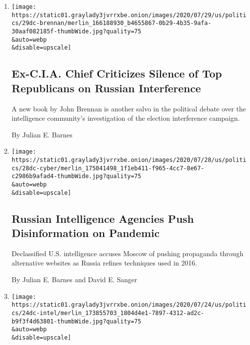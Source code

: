 \begin{enumerate}
\def\labelenumi{\arabic{enumi}.}
\item
  \href{/2020/07/29/us/politics/john-brennan-book.html}{}

  \texttt{[image: https://static01.graylady3jvrrxbe.onion/images/2020/07/29/us/politics/29dc-brennan/merlin\_166188930\_b4655867-0b29-4b35-9afa-30aaf082185f-thumbWide.jpg?quality=75\\\&auto=webp\\\&disable=upscale]}

  \hypertarget{ex-cia-chief-criticizes-silence-of-top-republicans-on-russian-interference}{%
  \subsection{Ex-C.I.A. Chief Criticizes Silence of Top Republicans on
  Russian
  Interference}\label{ex-cia-chief-criticizes-silence-of-top-republicans-on-russian-interference}}

  A new book by John Brennan is another salvo in the political debate
  over the intelligence community's investigation of the election
  interference campaign.

  By Julian E. Barnes
\item
  \href{/2020/07/28/us/politics/russia-disinformation-coronavirus.html}{}

  \texttt{[image: https://static01.graylady3jvrrxbe.onion/images/2020/07/28/us/politics/28dc-cyber/merlin\_175041498\_1f1eb411-f965-4cc7-8e67-c2986b9afad4-thumbWide.jpg?quality=75\\\&auto=webp\\\&disable=upscale]}

  \hypertarget{russian-intelligence-agencies-push-disinformation-on-pandemic}{%
  \subsection{Russian Intelligence Agencies Push Disinformation on
  Pandemic}\label{russian-intelligence-agencies-push-disinformation-on-pandemic}}

  Declassified U.S. intelligence accuses Moscow of pushing propaganda
  through alternative websites as Russia refines techniques used in
  2016.

  By Julian E. Barnes and David E. Sanger
\item
  \href{/2020/07/24/us/politics/election-interference-russia-china-iran.html}{}

  \texttt{[image: https://static01.graylady3jvrrxbe.onion/images/2020/07/24/us/politics/24dc-intel/merlin\_173855703\_1804d4e1-7897-4312-ad2c-b9f3f4d63801-thumbWide.jpg?quality=75\\\&auto=webp\\\&disable=upscale]}


\end{enumerate}
